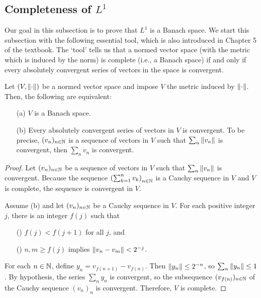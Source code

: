 \subsection{Completeness of $L^1$}
Our goal in this subsection is to prove that $L^1$ is a Banach space.
We start this subsection with the following essential tool, which is also introduced in Chapter 5 of the textbook.
The `tool' tells us that a normed vector space (with the metric which is induced by the norm) is complete (i.e., a Banach space) if and only if every absolutely convergent series of vectors in the space is convergent.
\begin{lem}\label{checking completeness of a vector space}
    Let $(V, {\left\lVert{\cdot}\right\rVert})$ be a normed vector space and impose $V$ the metric induced by ${\left\lVert{\cdot}\right\rVert}$.
    Then, the following are equivalent:
    \begin{enumerate}
        \item[(a)]
        {
            $V$ is a Banach space.
        }
        \item[(b)]
        {
            Every absolutely convergent series of vectors in $V$ is convergent.
            To be precise, $(v_n)_{n\in{\mathbb{N}}}$ is a sequence of vectors in $V$ such that $\sum_n{\left\lVert{v_n}\right\rVert}$ is convergent, then $\sum_n v_n$ is convergent.
        }
    \end{enumerate}
\end{lem}
\begin{proof}
    Let $(v_n)_{n\in{\mathbb{N}}}$ be a sequence of vectors in $V$ such that $\sum_n{\left\lVert{v_n}\right\rVert}$ is convergent.
    Because the sequence $\left(\sum_{k=1}^n v_k\right)_{n\in{\mathbb{N}}}$ is a Cauchy sequence in $V$ and $V$ is complete, the sequence is convergent in $V$.

    Assume (b) and let $(v_n)_{n\in{\mathbb{N}}}$ be a Cauchy sequence in $V$.
    For each positive integer $j$, there is an integer $f(j)$ such that
    \begin{enumerate}
        \item[(\romannumeral 1)]
        {
            $f(j)<f(j+1)$ for all $j$, and
        }
        \item[(\romannumeral 2)]
        {
            $n, m\geq f(j)$ implies ${\left\lVert{v_n-v_m}\right\rVert}<2^{-j}$.
        }
    \end{enumerate}
    For each $n\in{\mathbb{N}}$, define $y_n=v_{f(n+1)}-v_{f(n)}$.
    Then ${\left\lVert{y_n}\right\rVert}\leq 2^{-n}$, so $\sum_n{\left\lVert{y_n}\right\rVert}\leq 1$.
    By hypothesis, the series $\sum_n y_n$ is convergent, so the subsequence $(v_{f(n)})_{n\in{\mathbb{N}}}$ of the Cauchy sequence $(v_n)_n$ is convergent.
    Therefore, $V$ is complete.
\end{proof}

